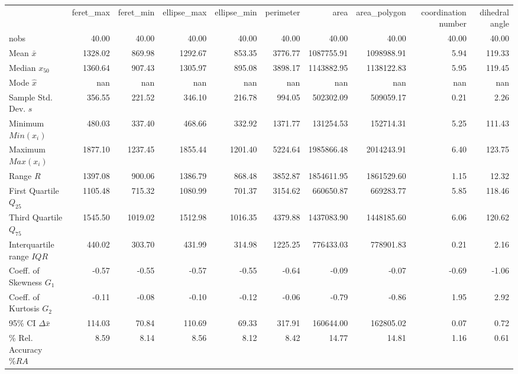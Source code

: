 \begin{tabular}{lrrrrrrrrr}
 & feret_max & feret_min & ellipse_max & ellipse_min & perimeter & area & area_polygon & coordination number & dihedral angle \\
nobs & 40.00 & 40.00 & 40.00 & 40.00 & 40.00 & 40.00 & 40.00 & 40.00 & 40.00 \\
Mean $\bar{x}$ & 1328.02 & 869.98 & 1292.67 & 853.35 & 3776.77 & 1087755.91 & 1098988.91 & 5.94 & 119.33 \\
Median $x_{50}$ & 1360.64 & 907.43 & 1305.97 & 895.08 & 3898.17 & 1143882.95 & 1138122.83 & 5.95 & 119.45 \\
Mode $\hat{x}$ & nan & nan & nan & nan & nan & nan & nan & nan & nan \\
Sample Std. Dev. $s$ & 356.55 & 221.52 & 346.10 & 216.78 & 994.05 & 502302.09 & 509059.17 & 0.21 & 2.26 \\
Minimum $Min(x_i)$ & 480.03 & 337.40 & 468.66 & 332.92 & 1371.77 & 131254.53 & 152714.31 & 5.25 & 111.43 \\
Maximum $Max(x_i)$ & 1877.10 & 1237.45 & 1855.44 & 1201.40 & 5224.64 & 1985866.48 & 2014243.91 & 6.40 & 123.75 \\
Range $R$ & 1397.08 & 900.06 & 1386.79 & 868.48 & 3852.87 & 1854611.95 & 1861529.60 & 1.15 & 12.32 \\
First Quartile $Q_{25}$ & 1105.48 & 715.32 & 1080.99 & 701.37 & 3154.62 & 660650.87 & 669283.77 & 5.85 & 118.46 \\
Third Quartile $Q_{75}$ & 1545.50 & 1019.02 & 1512.98 & 1016.35 & 4379.88 & 1437083.90 & 1448185.60 & 6.06 & 120.62 \\
Interquartile range $IQR$ & 440.02 & 303.70 & 431.99 & 314.98 & 1225.25 & 776433.03 & 778901.83 & 0.21 & 2.16 \\
Coeff. of Skewness $G_1$ & -0.57 & -0.55 & -0.57 & -0.55 & -0.64 & -0.09 & -0.07 & -0.69 & -1.06 \\
Coeff. of Kurtosis $G_2$ & -0.11 & -0.08 & -0.10 & -0.12 & -0.06 & -0.79 & -0.86 & 1.95 & 2.92 \\
95\% CI $\Delta \bar{x}$ & 114.03 & 70.84 & 110.69 & 69.33 & 317.91 & 160644.00 & 162805.02 & 0.07 & 0.72 \\
\% Rel. Accuracy $\%RA$ & 8.59 & 8.14 & 8.56 & 8.12 & 8.42 & 14.77 & 14.81 & 1.16 & 0.61 \\
\end{tabular}
